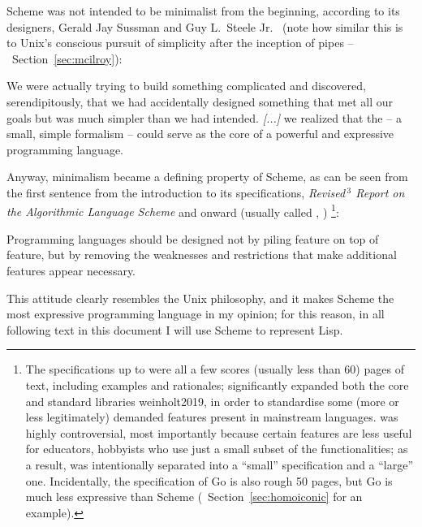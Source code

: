 Scheme was not intended to be minimalist from the beginning, according to its
designers, Gerald Jay Sussman and Guy L.\ Steele Jr.%
\ (note how similar this is to Unix's conscious pursuit of simplicity after
the inception of pipes -- \cf~Section~\ref{sec:mcilroy}):
\begin{quoting}
	We were actually trying to build something complicated
	and discovered, serendipitously, that we had accidentally
	designed something that met all our goals but was much simpler
	than we had intended.  \emph{[...]} we realized that the
	 -- a small, simple formalism --
	could serve as the core of a powerful and expressive programming language.
\end{quoting}
Anyway, minimalism became a defining property of Scheme, as can be seen
from the first sentence from the introduction to its specifications,
\emph{Revised$\,^3\!$ Report on the Algorithmic Language Scheme} and
onward (usually called ,  \etc)%
\footnote{\label{fn:r6rs}The specifications up to  were all a few
scores (usually less than 60) pages of text, including examples and rationales;
 significantly expanded both the core and standard libraries\cupercite%
{weinholt2019}, in order to standardise some (more or less legitimately)
demanded features present in mainstream languages.   was highly
controversial, most importantly because certain features are less useful
for educators, hobbyists \etc{} who use just a small subset of the
functionalities; as a result, 
was intentionally separated into a ``small'' specification and a
``large'' one.  Incidentally, the specification of Go is also
rough 50 pages, but Go is much less expressive than Scheme
(\cf~Section~\ref{sec:homoiconic} for an example).}:
\begin{quoting}
	Programming languages should be designed not by piling
	feature on top of feature, but by removing the weaknesses and
	restrictions that make additional features appear necessary.
\end{quoting}
This attitude clearly resembles the Unix philosophy, and it makes Scheme
the most expressive programming language in my opinion; for this reason,
in all following text in this document I will use Scheme to represent Lisp.

